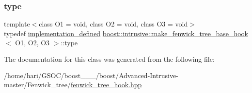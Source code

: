 \subsubsection{\texorpdfstring{type}{type}}
{\footnotesize\ttfamily template$<$class O1 = void, class O2 = void, class O3 = void$>$ \\
typedef \hyperlink{classboost_1_1intrusive_1_1make__fenwick__tree__base__hook_af661b0546c575716fb1fc71c0446929c}{implementation\+\_\+defined} \hyperlink{classboost_1_1intrusive_1_1make__fenwick__tree__base__hook}{boost\+::intrusive\+::make\+\_\+fenwick\+\_\+tree\+\_\+base\+\_\+hook}$<$ O1, O2, O3 $>$\+::\hyperlink{classboost_1_1intrusive_1_1make__fenwick__tree__base__hook_ac194b5544afb5fb14dca7765784c8eb7}{type}}



The documentation for this class was generated from the following file\+:\begin{DoxyCompactItemize}
\item 
/home/hari/\+G\+S\+O\+C/boost\+\_\+\_\+\_/boost/\+Advanced-\/\+Intrusive-\/master/\+Fenwick\+\_\+tree/\hyperlink{fenwick__tree__hook_8hpp}{fenwick\+\_\+tree\+\_\+hook.\+hpp}\end{DoxyCompactItemize}
